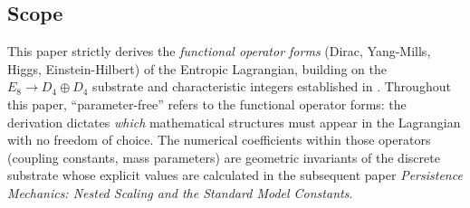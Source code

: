 \subsection{Scope}
This paper strictly derives the \textit{functional operator forms} (Dirac, Yang-Mills, Higgs, Einstein-Hilbert) of the Entropic Lagrangian, building on the $E_8 \to D_4 \oplus D_4$ substrate and characteristic integers established in \cite{meyer_informational_2026}. Throughout this paper, ``parameter-free'' refers to the functional operator forms: the derivation dictates \emph{which} mathematical structures must appear in the Lagrangian with no freedom of choice. The numerical coefficients within those operators (coupling constants, mass parameters) are geometric invariants of the discrete substrate whose explicit values are calculated in the subsequent paper \textit{Persistence Mechanics: Nested Scaling and the Standard Model Constants}.